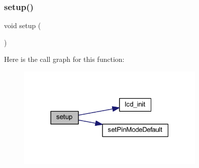 \subsubsection{\texorpdfstring{setup()}{setup()}}
{\footnotesize\ttfamily void setup (\begin{DoxyParamCaption}{ }\end{DoxyParamCaption})}

Here is the call graph for this function\+:\nopagebreak
\begin{figure}[H]
\begin{center}
\leavevmode
\includegraphics[width=255pt]{evive_8ino_a4fc01d736fe50cf5b977f755b675f11d_cgraph}
\end{center}
\end{figure}
